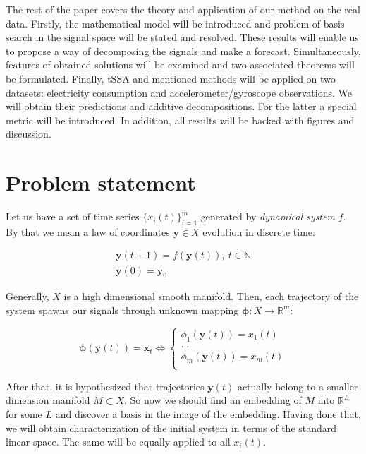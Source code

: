 \documentclass[referee, pdflatex]{sn-jnl}
\theoremstyle{definition}
\theoremstyle{plain}
\begin{document}
	The rest of the paper covers the theory and application of our method on the real data. Firstly, the mathematical model will be introduced and problem of basis search in the signal space will be stated and resolved. These results will enable us to propose a way of decomposing the signals and make a forecast. Simultaneously, features of obtained solutions will be examined and two associated theorems will be formulated. Finally, tSSA and mentioned methods will be applied on two datasets: electricity consumption and accelerometer/gyroscope observations. We will obtain their predictions and additive decompositions. For the latter a special metric will be introduced. In addition, all results will be backed with figures and discussion.
	
	\section{Problem statement}\label{sec:problem_statement}
	
	Let us have a set of time series $ \{x_i(t)\}_{i=1}^m $ generated by \emph{dynamical system} $ f $. By that we mean a law of coordinates $ \mathbf{y} \in X $ evolution in discrete time:
	
	\begin{gather*}
		\mathbf{y}(t + 1) = f(\mathbf{y}(t)), \ t \in \mathbb{N} \\
		\mathbf{y}(0) = \mathbf{y}_0
	\end{gather*}
	
	Generally, $ X $ is a high dimensional smooth manifold. Then, each trajectory of the system spawns our signals through unknown mapping $ \boldsymbol{\phi}: X \to \mathbb{R}^m $:
	
	\begin{equation*}
		\boldsymbol{\phi}(\mathbf{y}(t)) = \mathbf{x}_t \Leftrightarrow \begin{cases}
			\phi_1(\mathbf{y}(t)) = x_1(t) \\
			\ldots \\
			\phi_m(\mathbf{y}(t)) = x_m(t) \\
		\end{cases}
	\end{equation*}
	
	After that, it is hypothesized that trajectories $ \mathbf{y}(t) $ actually belong to a smaller dimension manifold $ M \subset X $. So now we should find an embedding of $ M $ into $ \mathbb{R}^{L} $ for some $ L $ and discover a basis in the image of the embedding. Having done that, we will obtain characterization of the initial system in terms of the standard linear space. The same will be equally applied to all $ x_i(t) $.
	
\end{document}
